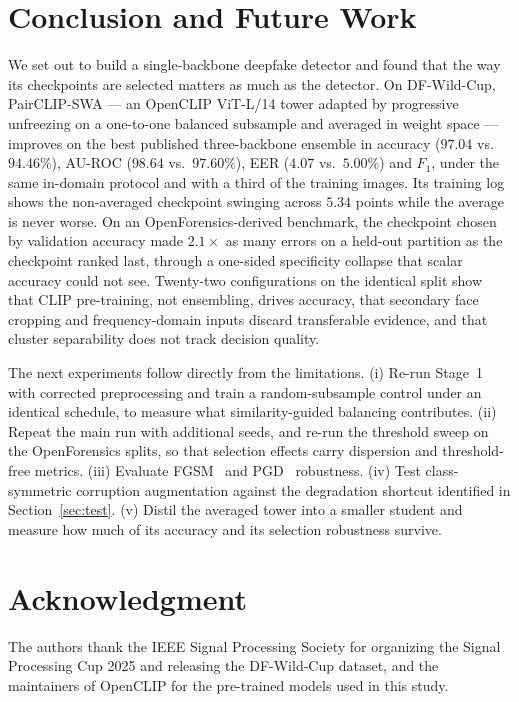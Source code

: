 \documentclass[10pt,journal]{IEEEtran}
\begin{document}
\section{Conclusion and Future Work}\label{sec:conclusion}
We set out to build a single-backbone deepfake detector and found that the way
its checkpoints are selected matters as much as the detector. On DF-Wild-Cup,
PairCLIP-SWA --- an OpenCLIP ViT-L/14 tower adapted by progressive unfreezing on a
one-to-one balanced subsample and averaged in weight space --- improves on the
best published three-backbone ensemble in accuracy ($97.04$ vs.\ $94.46\%$),
AU-ROC ($98.64$ vs.\ $97.60\%$), EER ($4.07$ vs.\ $5.00\%$) and $F_1$, under the
same in-domain protocol and with a third of the training images. Its training
log shows the non-averaged checkpoint swinging across $5.34$ points while the
average is never worse. On an OpenForensics-derived benchmark, the checkpoint
chosen by validation accuracy made $2.1\times$ as many errors on a held-out
partition as the checkpoint ranked last, through a one-sided specificity
collapse that scalar accuracy could not see. Twenty-two configurations on the
identical split show that CLIP pre-training, not ensembling, drives accuracy,
that secondary face cropping and frequency-domain inputs discard transferable
evidence, and that cluster separability does not track decision quality.

The next experiments follow directly from the limitations. (i) Re-run Stage~1
with corrected preprocessing and train a random-subsample control under an
identical schedule, to measure what similarity-guided balancing contributes.
(ii) Repeat the main run with additional seeds, and re-run the threshold sweep
on the OpenForensics splits, so that selection effects carry dispersion and
threshold-free metrics. (iii) Evaluate FGSM~\cite{goodfellow2015fgsm} and
PGD~\cite{madry2018pgd} robustness. (iv) Test class-symmetric corruption
augmentation against the degradation shortcut identified in
Section~\ref{sec:test}. (v) Distil the averaged tower into a smaller student and
measure how much of its accuracy and its selection robustness survive.

\section*{Acknowledgment}
The authors thank the IEEE Signal Processing Society for organizing the Signal
Processing Cup 2025 and releasing the DF-Wild-Cup dataset, and the maintainers
of OpenCLIP for the pre-trained models used in this study.



\end{document}
